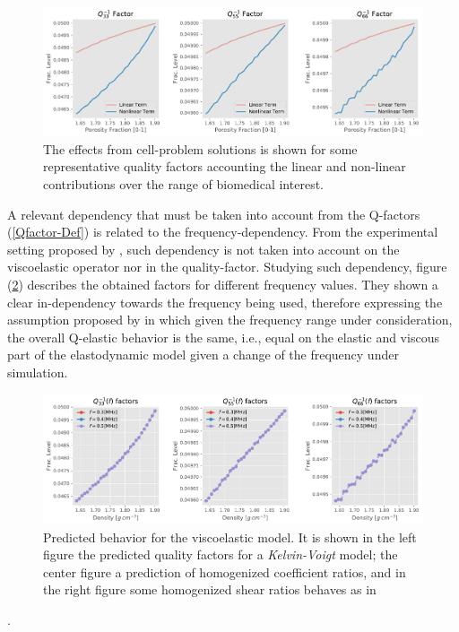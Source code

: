 \begin{figure}[!h]
	\centering
	\includegraphics[width=\textwidth]{images/Qfactors/PlotsVisc_Circular2DPart50EPS5-2_Ome05.pdf}
	\caption{The effects from cell-problem solutions is shown for some representative quality factors accounting the linear and non-linear contributions over the range of biomedical interest.}
	\label{QfactorDecomposition}
\end{figure} 

A relevant dependency that must be taken into account from the Q-factors (\ref{Qfactor-Def}) is related to the frequency-dependency. From the experimental setting proposed by \cite{Bernard2015}, such dependency is not taken into account on the viscoelastic operator nor in the quality-factor. 
Studying such dependency, figure (\ref{BernardPrediction-Freq}) describes the obtained factors for different frequency values. They shown a clear in-dependency towards the frequency being used, therefore expressing the assumption proposed by \cite{Bernard2015} in which given the frequency range under consideration, the overall Q-elastic behavior is the same, i.e., equal on the elastic and viscous part of the elastodynamic model given a change of the frequency under simulation.
\begin{figure}[!h]
	\centering
	\includegraphics[width=\textwidth]{images/Qfactors/QfactorsFreqsEPS5-2.pdf}
	\caption{Predicted behavior for the viscoelastic model. It is shown in the left figure the predicted quality factors for a \textit{Kelvin-Voigt} model; the center figure a prediction of homogenized coefficient ratios, and in the right figure some homogenized shear ratios behaves as in \cite{Bernard2015} }
	\label{BernardPrediction-Freq}
\end{figure}.






